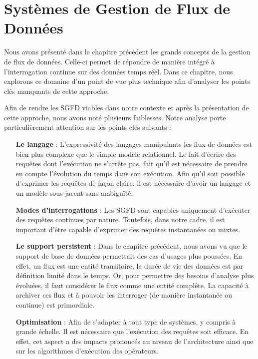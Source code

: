 
\chapter{Systèmes de Gestion de Flux de Données}
\chaptertoc
Nous avons présenté dans le chapitre précédent les grands concepts de la gestion de flux de données. Celle-ci permet de répondre de manière intégré à l'interrogation continue sur des données temps réel. Dans ce chapitre, nous explorons ce domaine d'un point de vue plus technique afin d'analyser les points clés manquants de cette approche.

Afin de rendre les SGFD viables dans notre contexte et après la présentation de cette approche, nous avons noté plusieurs faiblesses. Notre analyse porte particulièrement attention sur les points clés suivants : 
\begin{itemize}
	\item[\textbf{Le langage}] : L'expressivité des langages manipulants les flux de données est bien plus complexe que le simple modèle relationnel. Le fait d'écrire des requêtes dont l'exécution ne s'arrête pas, fait qu'il est nécessaire de prendre en compte l'évolution du temps dans son exécution. Afin qu'il soit possible d'exprimer les requêtes de façon claire, il est nécessaire d'avoir un langage et un modèle sous-jacent sans ambiguïté.
	\item[\textbf{Modes d'interrogations}] : Les SGFD sont capables uniquement d'exécuter des requêtes continues par nature. Toutefois, dans notre cadre, il est important d'être capable d'exprimer des requêtes instantanées ou mixtes. 
	\item[\textbf{Le support persistent}] : Dans le chapitre précédent, nous avons vu que le support de base de données permettait des cas d'usages plus poussées. En effet, un flux est une entité transitoire, la durée de vie des données est par définition limité dans le temps. Or, pour permettre des besoins d'analyse plus évoluées, il faut considérer le flux comme une entité complête. La capacité à archiver ces flux et à pouvoir les interroger (de manière instantanée ou continue) est primordiale.
	\item[\textbf{Optimisation}] : Afin de s'adapter à tout type de systèmes, y compris à grande échelle. Il est nécessaire que l'exécution des requêtes soit efficace. En effet, cet aspect a des impacts prononcés au niveau de l'architecture ainsi que sur les algorithmes d'exécution des opérateurs.
\end{itemize}

